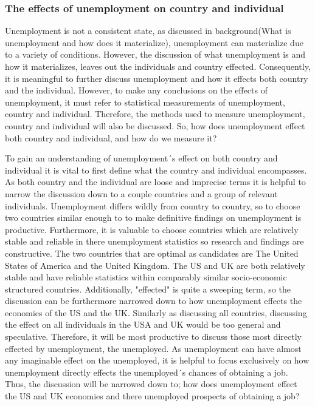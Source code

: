 \subsubsection{The effects of unemployment on country and individual}
Unemployment is not a consistent state, as discussed in background(What is unemployment and how does it materialize), unemployment can materialize due to a variety of conditions.
However, the discussion of what unemployment is and how it materializes, leaves out the individuals and country effected.
Consequently, it is meaningful to further discuss unemployment and how it effects both country and the individual.
However, to make any conclusions on the effects of unemployment, it must refer to statistical measurements of unemployment, country and individual. 
Therefore, the methods used to measure unemployment, country and individual will also be discussed.
So, how does unemployment effect both country and individual, and how do we measure it?

To gain an understanding of unemployment´s effect on both country and individual it is vital to first define what the country and individual encompasses.
As both country and the individual are loose and imprecise terms it is helpful to narrow the discussion down to a couple countries and a group of relevant individuals.
Unemployment differs wildly from country to country, so to choose two countries similar enough to to make definitive findings on unemployment is productive.
Furthermore, it is valuable to choose countries which are relatively stable and reliable in there unemployment statistics so research and findings are constructive.
The two countries that are optimal as candidates are The United States of America and the United Kingdom.
The US and UK are both relatively stable and have reliable statistics within comparably similar socio-economic structured countries. \cite{Economic_similarities_US_UK}
Additionally, "effected" is quite a sweeping term, so the discussion can be furthermore narrowed down to how unemployment effects the economics of the US and the UK.
Similarly as discussing all countries, discussing the effect on all individuals in the USA and UK would be too general and speculative.
Therefore, it will be most productive to discuss those most directly effected by unemployment, the unemployed.
As unemployment can have almost any imaginable effect on the unemployed, it is helpful to focus exclusively on how unemployment directly effects the unemployed´s chances of obtaining a job.
Thus, the discussion will be narrowed down to; how does unemployment effect the US and UK economies and there unemployed prospects of obtaining a job?


